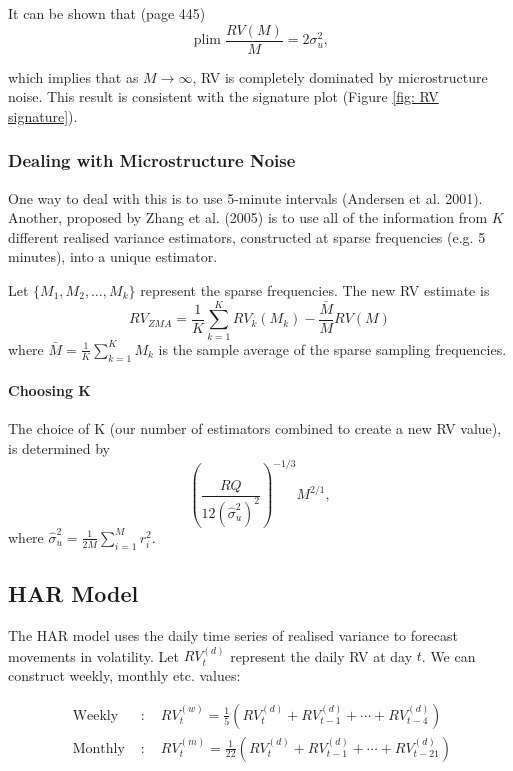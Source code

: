 \documentclass[11pt]{article}
\begin{document}
It can be shown that (page 445)
\[\operatorname{plim}\dfrac{RV(M)}{M} = 2\sigma_u^2,\]

which implies that as $M\rightarrow\infty$, RV is completely dominated by microstructure noise. This result is consistent with the signature plot (Figure \ref{fig: RV signature}).

\subsubsection{Dealing with Microstructure Noise}

One way to deal with this is to use 5-minute intervals (Andersen et al. 2001). Another, proposed by Zhang et al. (2005) is to use all of the information from $K$ different realised variance estimators, constructed at sparse frequencies (e.g. 5 minutes), into a unique estimator.

Let $\{M_1, M_2, \ldots, M_k\}$ represent the sparse frequencies. The new RV estimate is
\begin{equation}
\label{RV ZMA}
R V_{Z M A}=\frac{1}{K} \sum_{k=1}^K R V_k\left(M_k\right)-\frac{\bar{M}}{M} R V(M)
\end{equation}
where $\bar{M} = \frac{1}{K}\sum_{k=1}^K M_k$ is the sample average of the sparse sampling frequencies.

\paragraph{Choosing K} \mbox{}

The choice of K (our number of estimators combined to create a new RV value), is determined by
\[\left(\dfrac{RQ}{12(\hat{\sigma}_u^2)^2}\right)^{-1/3} M^{2/1},\]
where $\hat{\sigma}_u^2 = \frac{1}{2M}\sum_{i=1}^M r_i^2$.

\subsection{HAR Model}
The HAR model uses the daily time series of realised variance to forecast movements in volatility. Let $RV_t^{(d)}$ represent the daily RV at day $t$. We can construct weekly, monthly etc. values:

\begin{equation}
\begin{array}{ll}
\text { Weekly } & : \quad R V_t^{(w)}=\frac{1}{5}\left(R V_t^{(d)}+R V_{t-1}^{(d)}+\cdots+R V_{t-4}^{(d)}\right) \\
\text { Monthly } & : \quad R V_t^{(m)}=\frac{1}{22}\left(R V_t^{(d)}+R V_{t-1}^{(d)}+\cdots+R V_{t-21}^{(d)}\right)
\end{array}
\end{equation}
\end{document}
